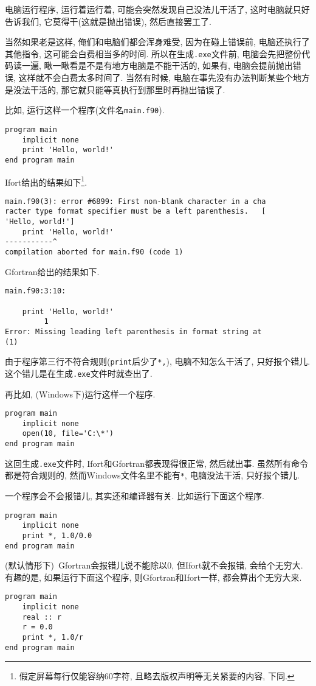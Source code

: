 电脑运行程序, 运行着运行着, 可能会突然发现自己没法儿干活了, 这时电脑就只好告诉我们, 它莫得干(这就是抛出错误), 然后直接罢工了.

当然如果老是这样, 俺们和电脑们都会浑身难受, 因为在碰上错误前, 电脑还执行了其他指令, 这可能会白费相当多的时间. 所以在生成\texttt{.exe}文件前, 电脑会先把整份代码读一遍, 瞅一瞅看是不是有地方电脑是不能干活的, 如果有, 电脑会提前抛出错误, 这样就不会白费太多时间了. 当然有时候, 电脑在事先没有办法判断某些个地方是没法干活的, 那它就只能等真执行到那里时再抛出错误了.

比如, 运行这样一个程序(文件名\texttt{main.f90}).
\begin{lstlisting}
program main
    implicit none
    print 'Hello, world!'
end program main
\end{lstlisting}

Ifort给出的结果如下\footnote{
    假定屏幕每行仅能容纳60字符, 且略去版权声明等无关紧要的内容, 下同.
}.
\begin{lstlisting}
main.f90(3): error #6899: First non-blank character in a cha
racter type format specifier must be a left parenthesis.   [
'Hello, world!']
    print 'Hello, world!'
-----------^
compilation aborted for main.f90 (code 1)
\end{lstlisting}

Gfortran给出的结果如下.
\begin{lstlisting}
main.f90:3:10:

    print 'Hello, world!'
         1
Error: Missing leading left parenthesis in format string at 
(1)
\end{lstlisting}

由于程序第三行不符合规则(\texttt{print}后少了\texttt{*,}), 电脑不知怎么干活了, 只好报个错儿. 这个错儿是在生成\texttt{.exe}文件时就查出了.

再比如, (Windows下)运行这样一个程序.
\begin{lstlisting}
program main
    implicit none
    open(10, file='C:\*')
end program main
\end{lstlisting}

这回生成\texttt{.exe}文件时, Ifort和Gfortran都表现得很正常, 然后就出事. 虽然所有命令都是符合规则的, 然而Windows文件名里不能有\texttt{*}, 电脑没法干活, 只好报个错儿.

一个程序会不会报错儿, 其实还和编译器有关. 比如运行下面这个程序.
\begin{lstlisting}
program main
    implicit none
    print *, 1.0/0.0
end program main
\end{lstlisting}
(默认情形下)~Gfortran会报错儿说不能除以0, 但Ifort就不会报错, 会给个无穷大. 有趣的是, 如果运行下面这个程序, 则Gfortran和Ifort一样, 都会算出个无穷大来.
\begin{lstlisting}
program main
    implicit none
    real :: r
    r = 0.0
    print *, 1.0/r
end program main
\end{lstlisting}

